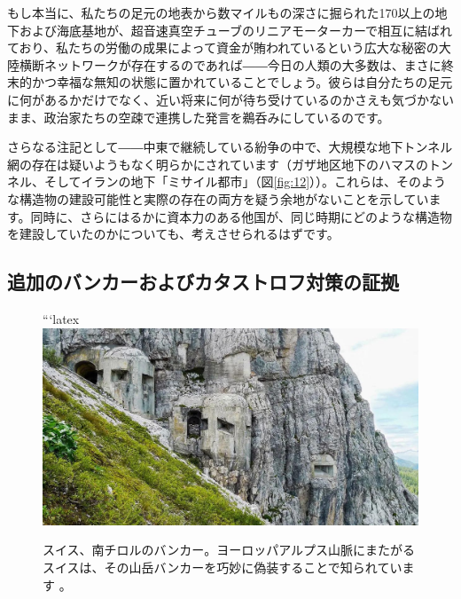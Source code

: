 \documentclass[10pt,twocolumn,letterpaper]{article}
\begin{document}
もし本当に、私たちの足元の地表から数マイルもの深さに掘られた170以上の地下および海底基地が、超音速真空チューブのリニアモーターカーで相互に結ばれており、私たちの労働の成果によって資金が賄われているという広大な秘密の大陸横断ネットワークが存在するのであれば――今日の人類の大多数は、まさに終末的かつ幸福な無知の状態に置かれていることでしょう。彼らは自分たちの足元に何があるかだけでなく、近い将来に何が待ち受けているのかさえも気づかないまま、政治家たちの空疎で連携した発言を鵜呑みにしているのです。

さらなる注記として――中東で継続している紛争の中で、大規模な地下トンネル網の存在は疑いようもなく明らかにされています（ガザ地区地下のハマスのトンネル\cite{38}、そしてイランの地下「ミサイル都市」（図\ref{fig:12}）\cite{39,40}）。これらは、そのような構造物の建設可能性と実際の存在の両方を疑う余地がないことを示しています。同時に、さらにはるかに資本力のある他国が、同じ時期にどのような構造物を建設していたのかについても、考えさせられるはずです。

\subsection{追加のバンカーおよびカタストロフ対策の証拠}

\begin{figure}[t]
\begin{center}

```latex
   \includegraphics[width=1\linewidth]{tyrol.jpg}
\end{center}
   \caption{スイス、南チロルのバンカー。ヨーロッパアルプス山脈にまたがるスイスは、その山岳バンカーを巧妙に偽装することで知られています \cite{32}。}
\label{fig:7}
\label{fig:onecol}
\end{figure}
\end{document}
